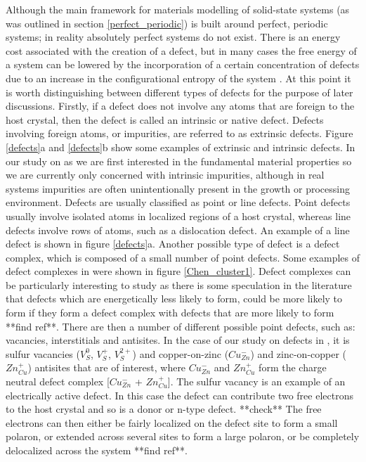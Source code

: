 Although the main framework for materials modelling of solid-state systems (as was outlined in section \ref{perfect_periodic}) is built around perfect, periodic systems; in reality absolutely perfect systems do not exist. There is an energy cost associated with the creation of a defect, but in many cases the free energy of a system can be lowered by the incorporation of a certain concentration of defects due to an increase in the configurational entropy of the system \cite{AshcroftMermin_general}. 
At this point it is worth distinguishing between different types of defects for the purpose of later discussions.
Firstly, if a defect does not involve any atoms that are foreign to the host crystal, then the defect is called an intrinsic or native defect. Defects involving foreign atoms, or impurities, are referred to as extrinsic defects. Figure \ref{defects}a and \ref{defects}b show some examples of extrinsic and intrinsic defects. In our study on {\CZTS} as we are first interested in the fundamental material properties so we are currently only concerned with intrinsic impurities, although in real systems impurities are often unintentionally present in the growth or processing environment.
Defects are usually classified as point or line defects. Point defects usually involve isolated atoms in localized regions of a host crystal, whereas line defects involve rows of atoms, such as a dislocation defect. An example of a line defect is shown in figure \ref{defects}a. Another possible type of defect is a defect complex, which is composed of a small number of point defects. Some examples of defect complexes in {\CZTS} were shown in figure \ref{Chen_cluster1}. Defect complexes can be particularly interesting to study as there is some speculation in the literature that defects which are energetically less likely to form, could be more likely to form if they form a defect complex with defects that are more likely to form **find ref**.
There are then a number of different possible point defects, such as: vacancies, interstitials and antisites. In the case of our study on defects in {\CZTS}, it is sulfur vacancies ($V_{S}^{0}$, $V_{S}^{+}$, $V_{S}^{2+}$) and copper-on-zinc ($Cu_{Zn}^{-}$) and zinc-on-copper ($Zn_{Cu}^{+}$) antisites that are of interest, where  $Cu_{Zn}^{-}$ and $Zn_{Cu}^{+}$ form the charge neutral defect complex [$Cu_{Zn}^{-}$ + $Zn_{Cu}^{+}$]. The sulfur vacancy is an example of an electrically active defect. In this case the defect can contribute two free electrons to the host crystal and so is a donor or n-type defect.
**check** The free electrons can then either be fairly localized on the defect site to form a small polaron, or extended across several sites to form a large polaron, or be completely delocalized across the system **find ref**.\\

